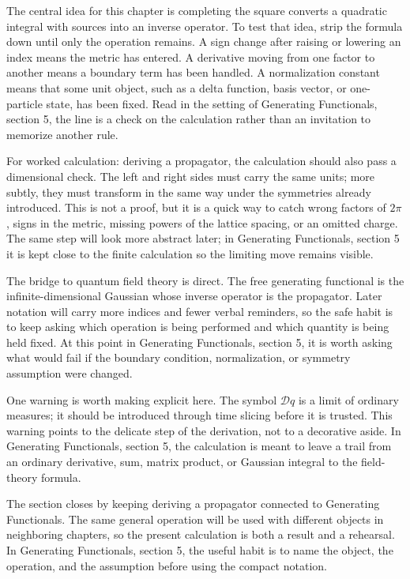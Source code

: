 The central idea for this chapter is completing the square converts a quadratic integral with sources into an inverse operator.  To test that idea, strip the formula down until only the operation remains.  A sign change after raising or lowering an index means the metric has entered.  A derivative moving from one factor to another means a boundary term has been handled.  A normalization constant means that some unit object, such as a delta function, basis vector, or one-particle state, has been fixed.  Read in the setting of Generating Functionals, section 5, the line is a check on the calculation rather than an invitation to memorize another rule.

For worked calculation: deriving a propagator, the calculation should also pass a dimensional check.  The left and right sides must carry the same units; more subtly, they must transform in the same way under the symmetries already introduced.  This is not a proof, but it is a quick way to catch wrong factors of \(2\pi\), signs in the metric, missing powers of the lattice spacing, or an omitted charge.  The same step will look more abstract later; in Generating Functionals, section 5 it is kept close to the finite calculation so the limiting move remains visible.

The bridge to quantum field theory is direct.  The free generating functional is the infinite-dimensional Gaussian whose inverse operator is the propagator.  Later notation will carry more indices and fewer verbal reminders, so the safe habit is to keep asking which operation is being performed and which quantity is being held fixed.  At this point in Generating Functionals, section 5, it is worth asking what would fail if the boundary condition, normalization, or symmetry assumption were changed.

One warning is worth making explicit here.  The symbol \(\mathcal D q\) is a limit of ordinary measures; it should be introduced through time slicing before it is trusted.  This warning points to the delicate step of the derivation, not to a decorative aside.  In Generating Functionals, section 5, the calculation is meant to leave a trail from an ordinary derivative, sum, matrix product, or Gaussian integral to the field-theory formula.

The section closes by keeping deriving a propagator connected to Generating Functionals.  The same general operation will be used with different objects in neighboring chapters, so the present calculation is both a result and a rehearsal.  In Generating Functionals, section 5, the useful habit is to name the object, the operation, and the assumption before using the compact notation.



